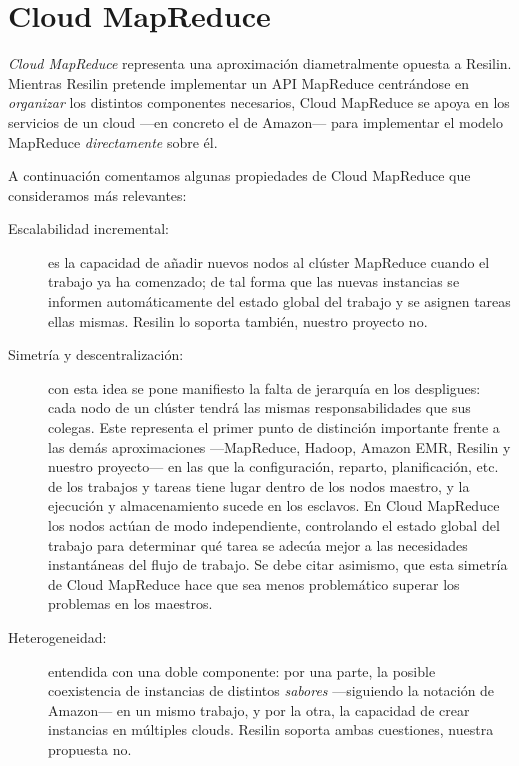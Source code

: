 \section{Cloud MapReduce}\label{sec:cloudmapred}
\noindent \emph{Cloud MapReduce} representa una aproximaci\'on diametralmente opuesta a Resilin. Mientras Resilin pretende implementar un API MapReduce centr\'andose en \emph{organizar} los distintos componentes necesarios, Cloud MapReduce se apoya en los servicios de un cloud ---en concreto el de Amazon--- para implementar el modelo MapReduce \cite{googlemapreduce} \emph{directamente} sobre \'el.\newline

A continuaci\'on comentamos algunas propiedades de Cloud MapReduce que consideramos m\'as relevantes:

\begin{description}
\item[Escalabilidad incremental:] es la capacidad de a\~nadir nuevos nodos al cl\'uster MapReduce cuando el trabajo ya ha comenzado; de tal forma que las nuevas instancias se informen autom\'aticamente del estado global del trabajo y se asignen tareas ellas mismas. Resilin \cite{resilin} lo soporta tambi\'en, nuestro proyecto no.
\item[Simetr\'ia y descentralizaci\'on:] con esta idea se pone manifiesto la falta de jerarqu\'ia en los despligues: cada nodo de un cl\'uster tendr\'a las mismas responsabilidades que sus colegas. Este representa el primer punto de distinci\'on importante frente a las dem\'as aproximaciones ---MapReduce, Hadoop, Amazon EMR, Resilin y nuestro proyecto--- en las que la configuraci\'on, reparto, planificaci\'on, etc. de los trabajos y tareas tiene lugar dentro de los nodos maestro, y la ejecuci\'on y almacenamiento sucede en los esclavos. En Cloud MapReduce los nodos act\'uan de modo independiente, controlando el estado global del trabajo para determinar qu\'e tarea se adec\'ua mejor a las necesidades instant\'aneas del flujo de trabajo. Se debe citar asimismo, que esta simetr\'ia de Cloud MapReduce hace que sea menos problem\'atico superar los problemas en los maestros.
\item[Heterogeneidad:] entendida con una doble componente: por una parte, la posible coexistencia de instancias de distintos \emph{sabores} ---siguiendo la notaci\'on de Amazon--- en un mismo trabajo, y por la otra, la capacidad de crear instancias en m\'ultiples clouds. Resilin soporta ambas cuestiones, nuestra propuesta no.
\end{description}

